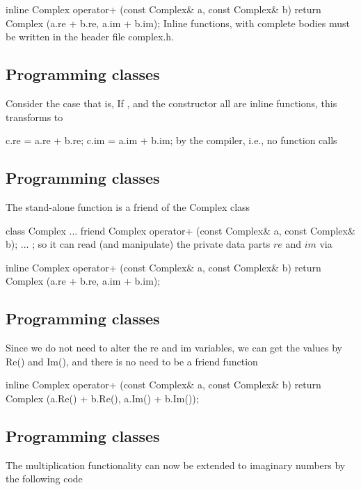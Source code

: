 \documentclass[%
twoside,                 %
final,                   %
10pt]{article}
\begin{document}
{{{{{{{{\bcppcod
inline Complex operator+ (const Complex& a, const Complex& b)
{ return Complex (a.re + b.re, a.im + b.im); }
\ecppcod
Inline functions, with complete bodies must be written in the header file  complex.h.

\subsection{Programming classes}

Consider  the case 
that is,  
If ,  and the constructor  all
are inline functions, this transforms to

\bcppcod
c.re = a.re + b.re;
c.im = a.im + b.im;
\ecppcod
by the compiler, i.e., no function calls

\subsection{Programming classes}

The stand-alone function  is a friend of the Complex  class

\bcppcod
class Complex
{
   ...
   friend Complex operator+ (const Complex& a, const Complex& b);
   ...
};
\ecppcod
so it can read (and manipulate) the private data parts $re$ and
$im$ via

\bcppcod
inline Complex operator+ (const Complex& a, const Complex& b)
{ return Complex (a.re + b.re, a.im + b.im); }
\ecppcod

\subsection{Programming classes}

Since we do not need to alter the re and im variables, we can
get the values by Re() and Im(), and there is no need to be a
friend function

\bcppcod
inline Complex operator+ (const Complex& a, const Complex& b)
{ return Complex (a.Re() + b.Re(), a.Im() + b.Im()); }
\ecppcod

\subsection{Programming classes}

The multiplication functionality can now be extended to imaginary numbers by the following code

}}}}}}}}
\end{document}
